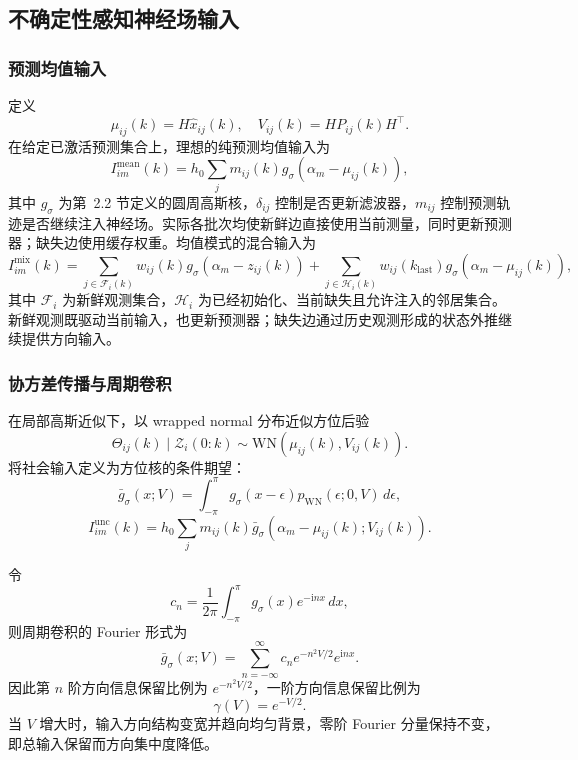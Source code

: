 \documentclass[UTF8,fontset=windows,11pt]{ctexart}
\begin{document}
\subsection{不确定性感知神经场输入}

\subsubsection{预测均值输入}
定义
\begin{equation}
 \mu_{ij}(k)=H\hat x_{ij}(k),\quad V_{ij}(k)=HP_{ij}(k)H^\top.
\end{equation}
在给定已激活预测集合上，理想的纯预测均值输入为
\begin{equation}
 I^{\mathrm{mean}}_{im}(k)=h_0\sum_jm_{ij}(k)
 g_\sigma(\alpha_m-\mu_{ij}(k)),
\end{equation}
其中 $g_\sigma$ 为第~2.2 节定义的圆周高斯核，$\delta_{ij}$ 控制是否更新滤波器，$m_{ij}$ 控制预测轨迹是否继续注入神经场。实际各批次均使新鲜边直接使用当前测量，同时更新预测器；缺失边使用缓存权重。均值模式的混合输入为
\begin{equation}
 I^{\mathrm{mix}}_{im}(k)
 =\sum_{j\in\mathcal F_i(k)}w_{ij}(k)g_\sigma(\alpha_m-z_{ij}(k))
 +\sum_{j\in\mathcal H_i(k)}w_{ij}(k_{\mathrm{last}})
 g_\sigma(\alpha_m-\mu_{ij}(k)),
 \label{eq:pilot_causal_input}
\end{equation}
其中 $\mathcal F_i$ 为新鲜观测集合，$\mathcal H_i$ 为已经初始化、当前缺失且允许注入的邻居集合。新鲜观测既驱动当前输入，也更新预测器；缺失边通过历史观测形成的状态外推继续提供方向输入。

\subsubsection{协方差传播与周期卷积}
在局部高斯近似下，以 wrapped normal 分布近似方位后验
\begin{equation}
 \Theta_{ij}(k)\mid\mathcal Z_i(0:k)\sim\mathrm{WN}(\mu_{ij}(k),V_{ij}(k)).
\end{equation}
将社会输入定义为方位核的条件期望：
\begin{equation}
 \bar g_\sigma(x;V)=\int_{-\pi}^{\pi}g_\sigma(x-\epsilon)p_{\mathrm{WN}}(\epsilon;0,V)\,d\epsilon,
\end{equation}
\begin{equation}
 I^{\mathrm{unc}}_{im}(k)=h_0\sum_jm_{ij}(k)\bar g_\sigma(\alpha_m-\mu_{ij}(k);V_{ij}(k)).
\end{equation}

令
\begin{equation}
 c_n=\frac{1}{2\pi}\int_{-\pi}^{\pi}g_\sigma(x)e^{-\mathrm inx}\,dx,
\end{equation}
则周期卷积的 Fourier 形式为
\begin{equation}
 \bar g_\sigma(x;V)=\sum_{n=-\infty}^{\infty}c_n e^{-n^2V/2}e^{\mathrm inx}.
\end{equation}
因此第 $n$ 阶方向信息保留比例为 $e^{-n^2V/2}$，一阶方向信息保留比例为
\begin{equation}
 \gamma(V)=e^{-V/2}.
\end{equation}
当 $V$ 增大时，输入方向结构变宽并趋向均匀背景，零阶 Fourier 分量保持不变，即总输入保留而方向集中度降低。
\end{document}
